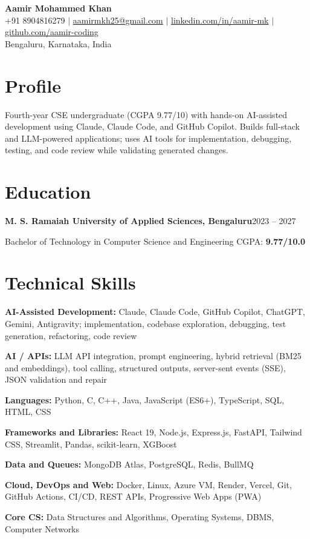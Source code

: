 \documentclass[a4paper,10pt]{article}
\newcommand{\resumeEntry}[2]{%
  \textbf{#1}\hfill {\small #2}\par\vspace{1pt}%
}
\newcommand{\skillrow}[2]{%
  \textbf{#1:} #2\par\vspace{2.2pt}%
}
\begin{document}
\begin{center}
  {\fontsize{21}{23}\selectfont\textbf{Aamir Mohammed Khan}}\\[3pt]
  {\small
  +91 8904816279 \; $|$ \;
  \href{mailto:aamirmkh25@gmail.com}{aamirmkh25@gmail.com}
  \; $|$ \;
  \href{https://www.linkedin.com/in/aamir-mk/}{linkedin.com/in/aamir-mk}
  \; $|$ \;
  \href{https://github.com/aamir-coding}{github.com/aamir-coding}}\\[2pt]
  {\small Bengaluru, Karnataka, India}
\end{center}
\vspace{-3pt}

\section{Profile}
Fourth-year CSE undergraduate (CGPA 9.77/10) with hands-on AI-assisted development using
Claude, Claude Code, and GitHub Copilot. Builds full-stack and LLM-powered applications;
uses AI tools for implementation, debugging, testing, and code review while validating
generated changes.

\section{Education}
\resumeEntry{M. S. Ramaiah University of Applied Sciences, Bengaluru}{2023 -- 2027}
Bachelor of Technology in Computer Science and Engineering
\hfill CGPA: \textbf{9.77/10.0}

\section{Technical Skills}
\skillrow{AI-Assisted Development}{Claude, Claude Code, GitHub Copilot, ChatGPT, Gemini, Antigravity; implementation, codebase exploration, debugging, test generation, refactoring, code review}
\skillrow{AI / APIs}{LLM API integration, prompt engineering, hybrid retrieval (BM25 and embeddings), tool calling, structured outputs, server-sent events (SSE), JSON validation and repair}
\skillrow{Languages}{Python, C, C++, Java, JavaScript (ES6+), TypeScript, SQL, HTML, CSS}
\skillrow{Frameworks and Libraries}{React 19, Node.js, Express.js, FastAPI, Tailwind CSS, Streamlit, Pandas, scikit-learn, XGBoost}
\skillrow{Data and Queues}{MongoDB Atlas, PostgreSQL, Redis, BullMQ}
\skillrow{Cloud, DevOps and Web}{Docker, Linux, Azure VM, Render, Vercel, Git, GitHub Actions, CI/CD, REST APIs, Progressive Web Apps (PWA)}
\skillrow{Core CS}{Data Structures and Algorithms, Operating Systems, DBMS, Computer Networks}
\end{document}
